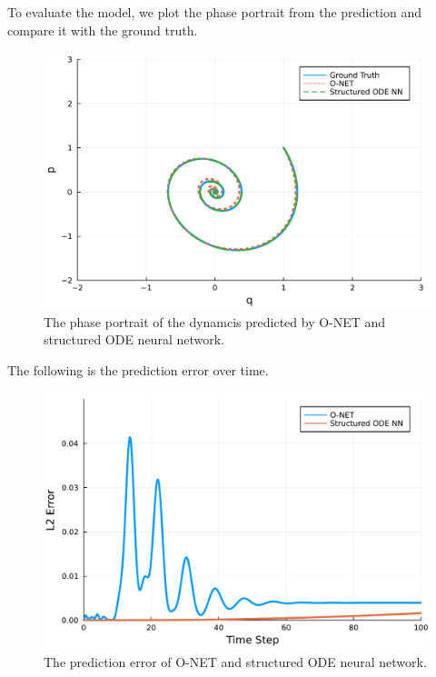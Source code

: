 \documentclass[
	parskip, 			   %
	twoside, 			   %
	DIV=14, 			   %
	BCOR=15.0mm, 		   %
	headsepline, 		   %
	open=right, 		   %
	captions=tableheading, %
	bibliography=totoc,    %
	numbers=noenddot       %
]{scrreprt}
\begin{document}
To evaluate the model, we plot the phase portrait from the prediction and compare it with the ground truth.

\clearpage
\begin{figure}[h!]
    \centering
    \includegraphics[scale=0.5]{figures/phase_portrait_idho_O_NET_and_structured_ODE_NN.pdf}
    \caption{The phase portrait of the dynamcis predicted by O-NET and structured ODE neural network.}
    \label{fig:phase_portrait_idho_O_NET_and_structured_ODE_NN}
\end{figure}

The following is the prediction error over time.

\begin{figure}[h!]
    \centering
    \includegraphics[scale=0.5]{figures/prediction_error_idho_O_NET_and_structured_ODE_NN.pdf}
    \caption{The prediction error of O-NET and structured ODE neural network.}
    \label{fig:prediction_error_idho_O_NET_and_structured_ODE_NN}
\end{figure}
\end{document}
